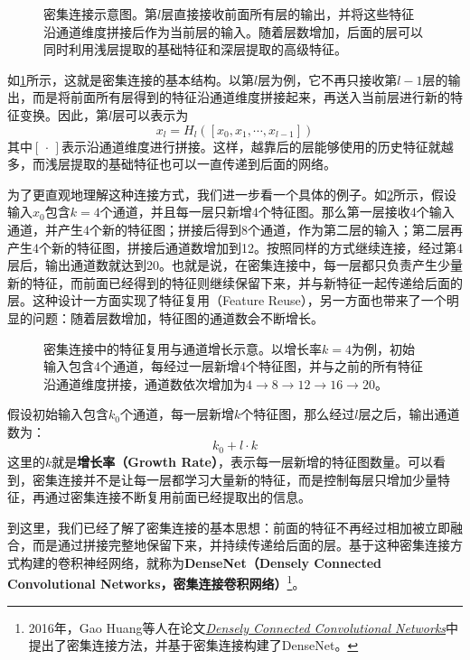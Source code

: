 \begin{figure}[H]
    \caption{密集连接示意图。第$l$层直接接收前面所有层的输出，并将这些特征沿通道维度拼接后作为当前层的输入。随着层数增加，后面的层可以同时利用浅层提取的基础特征和深层提取的高级特征。}
    \label{fig:dense_block}
\end{figure}

如\cref{fig:dense_block}所示，这就是密集连接的基本结构。以第$l$层为例，它不再只接收第$l-1$层的输出，而是将前面所有层得到的特征沿通道维度拼接起来，再送入当前层进行新的特征变换。因此，第$l$层可以表示为
$$
x_l=H_l\left([x_0,x_1,\cdots,x_{l-1}]\right)
$$
其中$[\,\cdot\,]$表示沿通道维度进行拼接。这样，越靠后的层能够使用的历史特征就越多，而浅层提取的基础特征也可以一直传递到后面的网络。

为了更直观地理解这种连接方式，我们进一步看一个具体的例子。如\cref{fig:dense}所示，假设输入$x_0$包含$k=4$个通道，并且每一层只新增4个特征图。那么第一层接收4个输入通道，并产生4个新的特征图；拼接后得到8个通道，作为第二层的输入；第二层再产生4个新的特征图，拼接后通道数增加到12。按照同样的方式继续连接，经过第4层后，输出通道数就达到20。也就是说，在密集连接中，每一层都只负责产生少量新的特征，而前面已经得到的特征则继续保留下来，并与新特征一起传递给后面的层。这种设计一方面实现了特征复用（Feature Reuse），另一方面也带来了一个明显的问题：随着层数增加，特征图的通道数会不断增长。

\begin{figure}[H]
    \caption{密集连接中的特征复用与通道增长示意。以增长率$k=4$为例，初始输入包含4个通道，每经过一层新增4个特征图，并与之前的所有特征沿通道维度拼接，通道数依次增加为$4\rightarrow8\rightarrow12\rightarrow16\rightarrow20$。}
    \label{fig:dense}
\end{figure}

假设初始输入包含$k_0$个通道，每一层新增$k$个特征图，那么经过$l$层之后，输出通道数为：
$$
k_0+l\cdot k
$$
这里的$k$就是\textbf{增长率（Growth Rate）}，表示每一层新增的特征图数量。可以看到，密集连接并不是让每一层都学习大量新的特征，而是控制每层只增加少量特征，再通过密集连接不断复用前面已经提取出的信息。

到这里，我们已经了解了密集连接的基本思想：前面的特征不再经过相加被立即融合，而是通过拼接完整地保留下来，并持续传递给后面的层。基于这种密集连接方式构建的卷积神经网络，就称为\textbf{DenseNet（Densely Connected Convolutional Networks，密集连接卷积网络）}\footnote{2016年，Gao Huang等人在论文\href{https://arxiv.org/abs/1608.06993}{\textit{Densely Connected Convolutional Networks}}中提出了密集连接方法，并基于密集连接构建了DenseNet。}。

